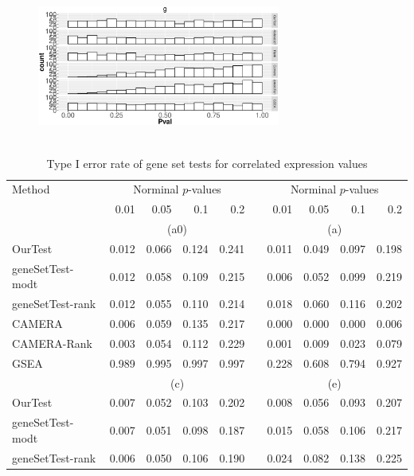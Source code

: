 \documentclass[11pt, a4paper]{article}
\begin{document}
\begin{figure}[]
\begin{center}
				\includegraphics[width=8cm,height=5cm]{Figures/NODEG.eps}
			\end{center} 
		\end{figure} 
		
		
\begin{table}[ht]
	\centering
	\caption{Type I error rate of gene set tests for correlated expression values }\label{table:typeIerror}
	\begin{tabular}{lrrrrlrrrr}
		\hline
		\cline{1-10}
		\multicolumn{1}{l}{Method} &\multicolumn{4}{c}{Norminal $p$-values}&  & \multicolumn{4}{c}{Norminal $p$-values} \\ \cline{2-10} 
		 & 0.01 & 0.05 & 0.1 & 0.2 &    & 0.01 &0.05 & 0.1 & 0.2 \\ 
		\hline
		  & \multicolumn{4}{c}{(a0)} & & \multicolumn{4}{c}{(a)} \\
		OurTest & 0.012 & 0.066 & 0.124 & 0.241 &  & 0.011 & 0.049 & 0.097 & 0.198 \\ 
		geneSetTest-modt & 0.012 & 0.058 & 0.109 & 0.215 &  & 0.006 & 0.052 & 0.099 & 0.219 \\ 
		geneSetTest-rank & 0.012 & 0.055 & 0.110 & 0.214 &  & 0.018 & 0.060 & 0.116 & 0.202 \\ 
		CAMERA & 0.006 & 0.059 & 0.135 & 0.217 &  & 0.000 & 0.000 & 0.000 & 0.006 \\ 
		CAMERA-Rank & 0.003 & 0.054 & 0.112 & 0.229 &  & 0.001 & 0.009 & 0.023 & 0.079 \\ 
		GSEA & 0.989 & 0.995 & 0.997 & 0.997 &  & 0.228 & 0.608 & 0.794 & 0.927 \\ 
			 & \multicolumn{4}{c}{(c)} &  & \multicolumn{4}{c}{(e)} \\
		OurTest & 0.007 & 0.052 & 0.103 & 0.202 &  & 0.008 & 0.056 & 0.093 & 0.207 \\ 
		geneSetTest-modt & 0.007 & 0.051 & 0.098 & 0.187 &  & 0.015 & 0.058 & 0.106 & 0.217 \\ 
		geneSetTest-rank & 0.006 & 0.050 & 0.106 & 0.190 &  & 0.024 & 0.082 & 0.138 & 0.225 \\ 

\end{tabular}
\end{table}
\end{document}
